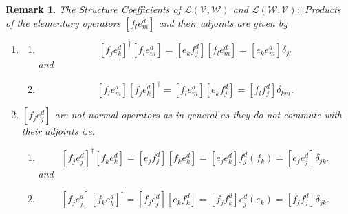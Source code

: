 \documentclass[aps,preprint]{revtex4}%
\newtheorem{remark}[theorem]{Remark}
\begin{document}
\begin{remark}
The \emph{Structure Coefficients} of $\mathcal{L}\left(  \mathcal{V}%
,\mathcal{W}\right)  $ and $\mathcal{L}\left(  \mathcal{W},\mathcal{V}\right)
:$ Products of the elementary operators $\left[  f_{l}e_{m}^{d}\right]  $ and
their adjoints are given by

\begin{enumerate}
\item
\begin{enumerate}
\item
\begin{equation}
\left[  f_{j}e_{k}^{d}\right]  ^{\dagger}\left[  f_{l}e_{m}^{d}\right]
=\left[  e_{k}f_{j}^{d}\right]  \left[  f_{l}e_{m}^{d}\right]  =\left[
e_{k}e_{m}^{d}\right]  \delta_{jl}%
\end{equation}
and

\item
\begin{equation}
\left[  f_{l}e_{m}^{d}\right]  \left[  f_{j}e_{k}^{d}\right]  ^{\dagger
}=\left[  f_{l}e_{m}^{d}\right]  \left[  e_{k}f_{j}^{d}\right]  =\left[
f_{l}f_{j}^{d}\right]  \delta_{km}.
\end{equation}

\end{enumerate}

\item $\left[  f_{j}e_{j}^{d}\right]  $ are not normal operators as in general
as they do not commute with their adjoints i.e.

\begin{enumerate}
\item
\begin{equation}
\left[  f_{j}e_{j}^{d}\right]  ^{\dagger}\left[  f_{k}e_{k}^{d}\right]
=\left[  e_{j}f_{j}^{d}\right]  \left[  f_{k}e_{k}^{d}\right]  =\left[
e_{j}e_{k}^{d}\right]  f_{j}^{d}\left(  f_{k}\right)  =\left[  e_{j}e_{j}%
^{d}\right]  \delta_{jk}.
\end{equation}
and

\item
\begin{equation}
\left[  f_{j}e_{j}^{d}\right]  \left[  f_{k}e_{k}^{d}\right]  ^{\dagger
}=\left[  f_{j}e_{j}^{d}\right]  \left[  e_{k}f_{k}^{d}\right]  =\left[
f_{j}f_{k}^{d}\right]  e_{j}^{d}\left(  e_{k}\right)  =\left[  f_{j}f_{j}%
^{d}\right]  \delta_{jk}.
\end{equation}

\end{enumerate}


\end{enumerate}
\end{remark}
\end{document}
